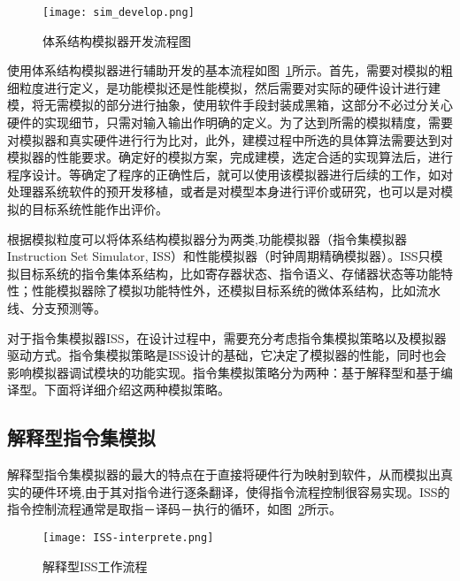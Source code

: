 \begin{figure}[h]
  \centering
  \texttt{[image: sim\_develop.png]}
  \caption{体系结构模拟器开发流程图}
  \label{fig:sim-dev-process}
\end{figure}

使用体系结构模拟器进行辅助开发的基本流程如图~\ref{fig:sim-dev-process}所示。首先，需要对模拟的粗细粒度进行定义，是功能模拟还是性能模拟，然后需要对实际的硬件设计进行建模，将无需模拟的部分进行抽象，使用软件手段封装成黑箱，这部分不必过分关心硬件的实现细节，只需对输入输出作明确的定义。为了达到所需的模拟精度，需要对模拟器和真实硬件进行行为比对，此外，建模过程中所选的具体算法需要达到对模拟器的性能要求。确定好的模拟方案，完成建模，选定合适的实现算法后，进行程序设计。等确定了程序的正确性后，就可以使用该模拟器进行后续的工作，如对处理器系统软件的预开发移植，或者是对模型本身进行评价或研究，也可以是对模拟的目标系统性能作出评价。


根据模拟粒度可以将体系结构模拟器分为两类,功能模拟器（指令集模拟器Instruction  Set  Simulator, ISS）和性能模拟器（时钟周期精确模拟器）\cite{单磊2012大规模并行片上系统的分布式并行模拟关键技术研究}。ISS只模拟目标系统的指令集体系结构，比如寄存器状态、指令语义、存储器状态等功能特性；性能模拟器除了模拟功能特性外，还模拟目标系统的微体系结构，比如流水线、分支预测等\cite{cachecengcideng}。

对于指令集模拟器ISS，在设计过程中，需要充分考虑指令集模拟策略以及模拟器驱动方式。指令集模拟策略是ISS设计的基础，它决定了模拟器的性能，同时也会影响模拟器调试模块的功能实现。指令集模拟策略分为两种：基于解释型和基于编译型。下面将详细介绍这两种模拟策略。



\subsection{解释型指令集模拟}
解释型指令集模拟器的最大的特点在于直接将硬件行为映射到软件，从而模拟出真实的硬件环境,由于其对指令进行逐条翻译，使得指令流程控制很容易实现\cite{jump,蔡启先2010mips64}。ISS的指令控制流程通常是取指－译码－执行的循环，如图~\ref{fig:ISS-interprete}所示。
\begin{figure}[h]
  \centering
  \texttt{[image: ISS-interprete.png]}
  \caption{解释型ISS工作流程}
  \label{fig:ISS-interprete}
\end{figure}


